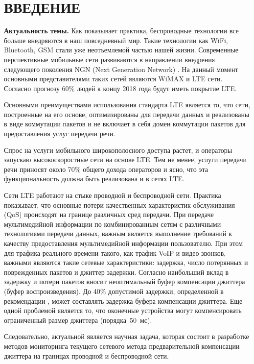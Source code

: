 \chapter*{ВВЕДЕНИЕ}							%

\textbf{Актуальность темы.} Как показывает практика, беспроводные технологии все больше внедряются в наш повседневный мир. Такие технологии как WiFi, Bluetooth, GSM стали уже неотъемлемой частью нашей жизни. 
Современные перспективные мобильные сети развиваются в направлении внедрения следующего поколения NGN (Next Generation Network) \cite{zacon:net,zacon:tele}. На данный момент основными представителями таких сетей являются WiMAX и LTE сети.
Согласно прогнозу \cite{ericsson} 60\% людей к концу 2018 года будут иметь покрытие LTE.


Основными преимуществами использования стандарта LTE является то, что сети, построенные на его основе, оптимизированы для передачи данных и реализованы в виде коммутации пакетов 
и не включает в себя домен коммутации пакетов для предоставления услуг передачи речи.

Спрос на услуги мобильного широкополосного доступа растет, и операторы запускаю высокоскоростные сети на основе LTE. 
Тем не менее, услуги передачи речи приносят около 70\% общего дохода операторов и ясно, что эта функциональность должна быть реализована и в сетях LTE.

Сети LTE работают на стыке проводной и беспроводной сети. %
Практика показывает, что основные потери качественных характеристик обслуживания (QoS) происходят на границе различных сред передачи.
При передаче мультимедийной информации по комбинированным сетям с различными технологиями передачи данных, важным является выполнение требований к качеству предоставления мультимедийной информации пользователю.
При этом для трафика реального времени такого, как трафик VoIP и видео звонков, важными являются такие сетевые характеристики:
задержка, число потерянных и поврежденных пакетов и джиттер задержки.
Согласно \cite{rokovoy} наибольший вклад в задержку и потери пакетов вносит неоптимальный буфер компенсации джиттера (буфер воспроизведения). До 40\% допустимой задержки, определенной в рекомендации \cite{G114}, может составлять задержка буфера компенсации джиттера.
Еще одной проблемой является то, что оконечные устройства могут компенсировать ограниченный размер джиттера (порядка~50~мс).

Следовательно, актуальной является научная задача, которая состоит в разработке методов мониторинга текущего сетевого метода предварительной компенсации джиттера на границах проводной и беспроводной сети.


